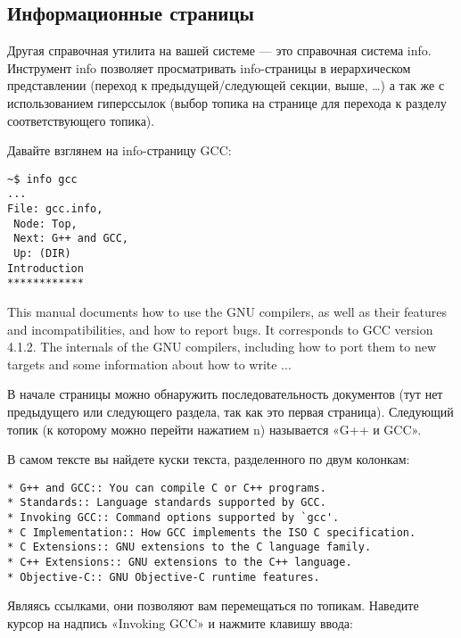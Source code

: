 \documentclass[12pt]{book}
\begin{document}
\subsection{Информационные страницы}

Другая справочная утилита на вашей системе — это справочная система info. Инструмент info позволяет просматривать info-страницы в иерархическом представлении (переход к предыдущей/следующей секции, выше, …) а так же с использованием гиперссылок (выбор топика на странице для перехода к разделу соответствующего топика).

Давайте взглянем на info-страницу GCC:

\vspace{3mm}
\begin{tcolorbox}
\begin{lstlisting}
~$ info gcc
...
File: gcc.info,
 Node: Top,
 Next: G++ and GCC,
 Up: (DIR)
Introduction
************
\end{lstlisting}
This manual documents how to use the GNU compilers, as well as their
features and incompatibilities, and how to report bugs. It corresponds
to GCC version 4.1.2. The internals of the GNU compilers, including
how to port them to new targets and some information about how to write
...

\end{tcolorbox}

В начале страницы можно обнаружить последовательность документов (тут нет предыдущего или следующего раздела, так как это первая страница). Следующий топик (к которому можно перейти нажатием n) называется «G++ и GCC».

В самом тексте вы найдете куски текста, разделенного по двум колонкам:

\vspace{3mm}
\begin{tcolorbox}
\begin{lstlisting}
* G++ and GCC:: You can compile C or C++ programs.
* Standards:: Language standards supported by GCC.
* Invoking GCC:: Command options supported by `gcc'.
* C Implementation:: How GCC implements the ISO C specification.
* C Extensions:: GNU extensions to the C language family.
* C++ Extensions:: GNU extensions to the C++ language.
* Objective-C:: GNU Objective-C runtime features.
\end{lstlisting}
\end{tcolorbox}

Являясь ссылками, они позволяют вам перемещаться по топикам. Наведите курсор на надпись «Invoking GCC» и нажмите клавишу ввода:
\end{document}
